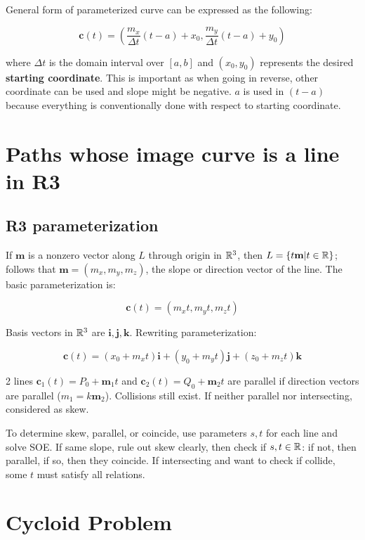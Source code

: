 \noindent
General form of parameterized curve can be expressed as the following:

\[\boxed{\textbf{c}(t)=(\frac{m_x}{\Delta t}(t-a)+x_0,\frac{m_y}{\Delta t}(t-a)+y_0)}\]

where $\Delta t$ is the domain interval over $[a,b]$ and $(x_0,y_0)$ represents the desired \textbf{starting coordinate}.
This is important as when going in reverse, other coordinate can be used and slope might be negative.
$a$ is used in $(t-a)$ because everything is conventionally done with respect to starting coordinate.

\section{Paths whose image curve is a line in R3}

\subsection{R3 parameterization}

If $\textbf{m}$ is a nonzero vector along $L$ through origin in $\mathbb{R}^3$, then $L=\{t\textbf{m}|t\in\mathbb{R}\}$;
follows that $\textbf{m}=(m_x,m_y,m_z)$, the slope or direction vector of the line. The basic parameterization is:

\[\textbf{c}(t)=(m_x t,m_y t,m_z t)\]

Basis vectors in $\mathbb{R}^3$ are $\textbf{i}, \textbf{j}, \textbf{k}$. Rewriting parameterization: 

\[\textbf{c}(t)=(x_0+m_x t) \textbf{i}+(y_0+m_y t) \textbf{j}+(z_0+m_z t) \textbf{k}\]

2 lines $\textbf{c}_1(t)=P_0+\textbf{m}_1t$ and $\textbf{c}_2(t)=Q_0+\textbf{m}_2t$ are parallel if
direction vectors are parallel ($\textbf{$m_1$}=k\textbf{m}_2$). Collisions still exist. If neither parallel nor intersecting, considered as skew.\newline

\noindent
To determine skew, parallel, or coincide, use parameters $s,t$ for each line and solve SOE.
If same slope, rule out skew clearly, then check if $s,t\in\mathbb{R}$: if not, then parallel, if so, then they coincide. If intersecting and want to check if collide, some $t$
must satisfy all relations.

\section{Cycloid Problem}

